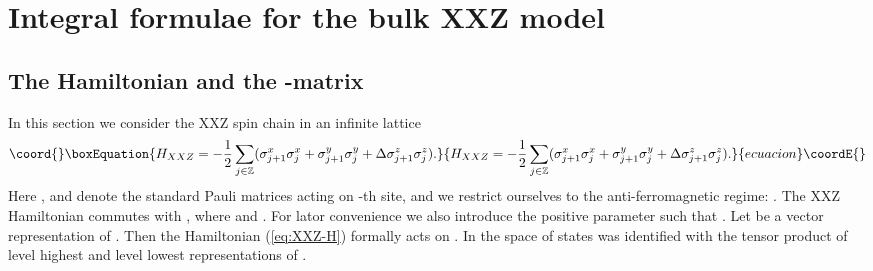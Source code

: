 \documentclass[a4paper,10pt]{article}
\begin{document}
\section{Integral formulae for the bulk XXZ model}

\subsection{The Hamiltonian and the \coordHE{}-matrix} 

In this section we consider the XXZ spin chain 
in an infinite lattice 
\begin{equation}\coord{}\boxEquation{
H_{XXZ}=-\frac{1}{2}\sum_{j\in\mathbb{Z}} 
(\sigma_{j+1}^x \sigma_{j}^x + \sigma_{j+1}^y 
\sigma_{j}^y +\Delta \sigma_{j+1}^z \sigma_{j}^z). 
\label{eq:XXZ-H}
}{
H_{XXZ}=-\frac{1}{2}\sum_{j\in\mathbb{Z}} 
(\sigma_{j+1}^x \sigma_{j}^x + \sigma_{j+1}^y 
\sigma_{j}^y +\Delta \sigma_{j+1}^z \sigma_{j}^z). 
}{ecuacion}\coordE{}\end{equation}
Here \coordHE{}, \coordHE{} and \coordHE{} 
denote the standard Pauli matrices acting on \coordHE{}-th site, 
and we 
restrict ourselves to the anti-ferromagnetic regime: 
\coordHE{}. 
The XXZ Hamiltonian \coordHE{} commutes with 
\coordHE{}, where 
\coordHE{} and \coordHE{}. For lator convenience 
we also introduce the positive parameter \coordHE{} such that 
\coordHE{}. Let \coordHE{} be a vector 
representation 
of \coordHE{}. Then 
the Hamiltonian (\ref{eq:XXZ-H}) formally acts on 
\coordHE{}. In \cite{JMbk} the space of states 
\coordHE{} was identified with the tensor 
product of level \coordHE{} highest and level \coordHE{} lowest 
representations of 
\coordHE{}. 
\end{document}
